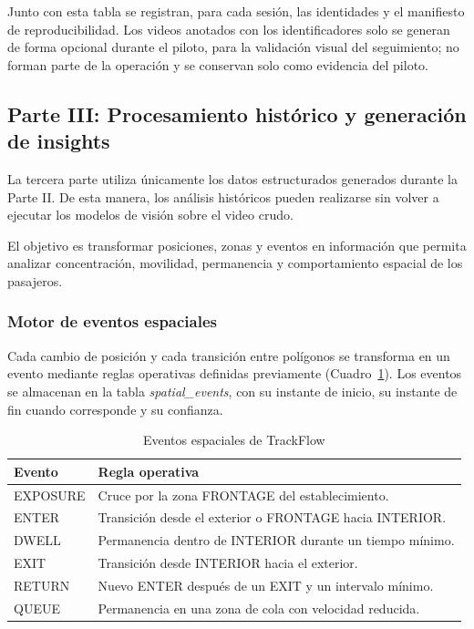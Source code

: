 \documentclass[12pt,a4paper]{article}
\begin{document}
Junto con esta tabla se registran, para cada sesión, las identidades y el manifiesto de
reproducibilidad. Los videos anotados con los identificadores solo se
generan de forma opcional durante el piloto, para la validación visual
del seguimiento; no forman parte de la operación y se conservan solo como
evidencia del piloto.

\subsection{Parte III: Procesamiento histórico y generación de insights}

La tercera parte utiliza únicamente los datos estructurados generados
durante la Parte II. De esta manera, los análisis históricos pueden
realizarse sin volver a ejecutar los modelos de visión sobre el video
crudo.

El objetivo es transformar posiciones, zonas y eventos en información
que permita analizar concentración, movilidad, permanencia y
comportamiento espacial de los pasajeros.

\subsubsection{Motor de eventos espaciales}

Cada cambio de posición y cada transición entre polígonos se transforma
en un evento mediante reglas operativas definidas previamente
(Cuadro~\ref{tab:spatial_events}). Los eventos se almacenan en la tabla
\textit{spatial\_events}, con su instante de inicio, su instante de fin
cuando corresponde y su confianza.

\begin{table}[H]
\caption{Eventos espaciales de TrackFlow}
\label{tab:spatial_events}
\centering
\footnotesize
\begin{tabular}{|p{}|p{}|}
\hline
\textbf{Evento} & \textbf{Regla operativa} \\
\hline
EXPOSURE & Cruce por la zona FRONTAGE del establecimiento. \\
\hline
ENTER & Transición desde el exterior o FRONTAGE hacia INTERIOR. \\
\hline
DWELL & Permanencia dentro de INTERIOR durante un tiempo mínimo. \\
\hline
EXIT & Transición desde INTERIOR hacia el exterior. \\
\hline
RETURN & Nuevo ENTER después de un EXIT y un intervalo mínimo. \\
\hline
QUEUE & Permanencia en una zona de cola con velocidad reducida. \\
\hline
\end{tabular}
\end{table}
\end{document}
